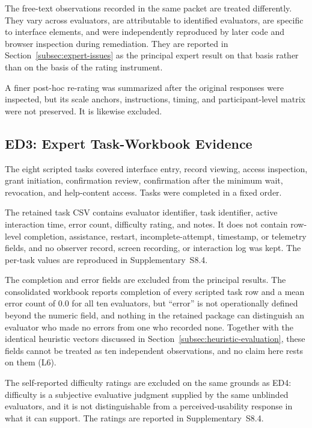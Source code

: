 \documentclass[journal]{IEEEtran}
\begin{document}
The free-text observations recorded in the same packet are treated differently. They vary across evaluators, are attributable to identified evaluators, are specific to interface elements, and were independently reproduced by later code and browser inspection during remediation. They are reported in Section~\ref{subsec:expert-issues} as the principal expert result on that basis rather than on the basis of the rating instrument.

A finer post-hoc re-rating was summarized after the original responses were inspected, but its scale anchors, instructions, timing, and participant-level matrix were not preserved. It is likewise excluded.

\subsection{ED3: Expert Task-Workbook Evidence}
\label{subsec:task-workbook}

The eight scripted tasks covered interface entry, record viewing, access inspection, grant initiation, confirmation review, confirmation after the minimum wait, revocation, and help-content access. Tasks were completed in a fixed order.

The retained task CSV contains evaluator identifier, task identifier, active interaction time, error count, difficulty rating, and notes. It does not contain row-level completion, assistance, restart, incomplete-attempt, timestamp, or telemetry fields, and no observer record, screen recording, or interaction log was kept. The per-task values are reproduced in Supplementary~S8.4.

The completion and error fields are excluded from the principal results. The consolidated workbook reports completion of every scripted task row and a mean error count of 0.0 for all ten evaluators, but ``error'' is not operationally defined beyond the numeric field, and nothing in the retained package can distinguish an evaluator who made no errors from one who recorded none. Together with the identical heuristic vectors discussed in Section~\ref{subsec:heuristic-evaluation}, these fields cannot be treated as ten independent observations, and no claim here rests on them (L6).

The self-reported difficulty ratings are excluded on the same grounds as ED4: difficulty is a subjective evaluative judgment supplied by the same unblinded evaluators, and it is not distinguishable from a perceived-usability response in what it can support. The ratings are reported in Supplementary~S8.4.
\end{document}
